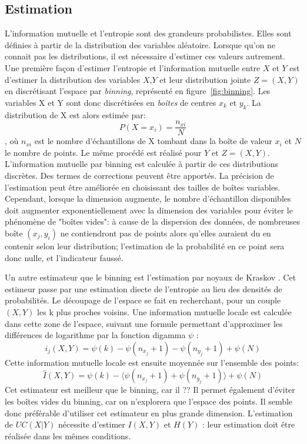 
\subsection{Estimation}
L'information mutuelle et l'entropie sont des grandeurs probabilistes. Elles sont définies à partir de la distribution des variables aléatoire. Lorsque qu'on ne connait pas les distributions, il est nécessaire d'estimer ces valeurs autrement. 
Une première façon d'estimer l'entropie et l'information mutuelle entre $X$ et $Y$ est d'estimer la distribution des variables $X$,$Y$ et leur distribution jointe $Z = (X,Y)$ en discrétisant l'espace par \emph{binning}, représenté en figure~\ref{fig:binning}. Les variables X et Y sont donc discrétisées en \emph{boîtes} de centres $x_k$ et $y_k$. La distribution de X est alors estimée par: 
$$P(X = x_i) = \frac{n_{xi}}{N} $$, où $n_{xi}$ est le nombre d'échantillons de X tombant dans la boîte de valeur $x_i$ et $N$ le nombre de points. Le même procédé est réalisé pour $Y$ et $Z = (X,Y)$.
L'information mutuelle par binning est calculée à partir de ces distributions discrètes.
Des termes de corrections peuvent être apportés. La précision de l'estimation peut être améliorée en choisissant des tailles de boîtes variables. Cependant, lorsque la dimension augmente, le nombre d'échantillon disponibles doit augmenter exponentiellement avec la dimension des variables pour éviter le phénomène de "boîtes vides": à cause de la dispersion des données, de nombreuses boîte $(x_j,y_i)$ ne contiendront pas de points alors qu'elles auraient du en contenir selon leur distribution; l'estimation de la probabilité en ce point sera donc nulle, et l'indicateur faussé. 

Un autre estimateur que le binning est l'estimation par noyaux de Kraskov \cite{2004kraskov}. Cet estimeur passe par une estimation diecte de l'entropie au lieu des densités de probabilités. Le découpage de l'espace se fait en recherchant, pour un couple $(X,Y)$ les k plus proches voisins. Une information mutuelle locale est calculée dans cette zone de l'espace, suivant une formule permettant d'approximer les différences de logarithme par la fonction digamma $\psi$ : 
$$i_j(X,Y) = \psi(k) - \psi(n_{x_j} + 1) - \psi(n_{y_j} +1) + \psi(N)$$
Cette information mutuelle locale est ensuite moyennée sur l'ensemble des points: 
$$\hat{I}(X,Y) = \psi(k) - \langle\psi(n_{x_j} + 1) + \psi(n_{y_j} +1)\rangle + \psi(N)$$
Cet estimateur est meilleur que le binning, car il ?? 
Il permet également d'éviter les boîtes vides du binning, car on n'explorera que l'espace des points. Il semble donc préférable d'utiliser cet estimateur en plus grande dimension.
L'estimation de $UC(X|Y)$ nécessite d'estimer $I(X,Y)$ et $H(Y)$ : leur estimation doit être réalisée dans les mêmes conditions.

